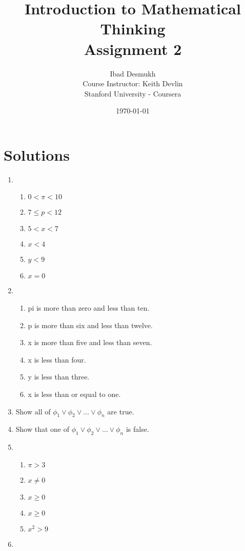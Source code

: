 \documentclass[11pt]{article}
\title{Introduction to Mathematical Thinking\\
       Assignment 2}
\author{Ibad Desmukh\\[1ex]
        \small Course Instructor: Keith Devlin\\
        \small Stanford University - Coursera}
\date{\today}
\begin{document}
\maketitle
\section*{Solutions}
\begin{enumerate}
    \item 
        \begin{enumerate}[label=(\alph*)]
            \item $0 < \pi < 10$
            \item $7 \leq p < 12$
            \item $5 < x < 7$
            \item $x < 4$
            \item $y < 9$
            \item $x = 0$
        \end{enumerate}
    \item
        \begin{enumerate}[label=(\alph*)]
            \item pi is more than zero and less than ten.
            \item p is more than six and less than twelve.
            \item x is more than five and less than seven.
            \item x is less than four.
            \item y is less than three.
            \item x is less than or equal to one.
        \end{enumerate}
    \item Show all of $\phi_1 \vee \phi_2 \vee \dots \vee \phi_n$ are true.
    \item Show that one of $\phi_1 \vee \phi_2 \vee \dots \vee \phi_n$ is false.
    \item
        \begin{enumerate}[label=(\alph*)]
            \item $\pi > 3$
            \item $x \neq 0$
            \item $x \geq 0$
            \item $x \geq 0$
            \item $x^2 > 9$
        \end{enumerate}
    \item

\end{enumerate}
\end{document}
